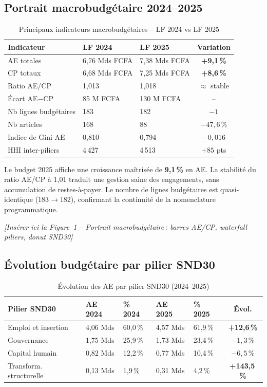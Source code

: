 \documentclass[12pt, a4paper]{article}
\newcommand{\pct}[1]{\textbf{#1\,\%}}
\newcommand{\sig}[1]{\textcolor{rougeCMR}{\textbf{#1}}}
\newcommand{\figref}[1]{\textcolor{bleuCMR}{\textit{[#1]}}}
\begin{document}
\subsection{Portrait macrobudgétaire 2024--2025}

\begin{table}[H]
\centering
\caption{Principaux indicateurs macrobudgétaires -- LF 2024 vs LF 2025}
\label{tab:macro}
\small
\begin{tabularx}{\linewidth}{lXXc}
\toprule
\rowcolor{bleuCMR!15}
\textbf{Indicateur} & \textbf{LF 2024} & \textbf{LF 2025} & \textbf{Variation} \\
\midrule
AE totales & 6,76 Mds FCFA & 7,38 Mds FCFA & \sig{+9,1\,\%} \\
CP totaux  & 6,68 Mds FCFA & 7,25 Mds FCFA & \sig{+8,6\,\%} \\
Ratio AE/CP & 1,013 & 1,018 & $\approx$ stable \\
Écart AE$-$CP & 85 M FCFA & 130 M FCFA & -- \\
Nb lignes budgétaires & 183 & 182 & $-1$ \\
Nb articles & 168 & 88 & $-47{,}6\,\%$ \\
Indice de Gini AE & 0,810 & 0,794 & $-0{,}016$ \\
HHI inter-piliers & 4\,427 & 4\,513 & $+85$ pts \\
\bottomrule
\end{tabularx}
\end{table}

Le budget 2025 affiche une croissance maîtrisée de \pct{9,1} en AE. La stabilité du ratio AE/CP 
à 1,01 traduit une gestion saine des engagements, sans accumulation de restes-à-payer. 
Le nombre de lignes budgétaires est quasi-identique (183$\to$182), confirmant la continuité 
de la nomenclature programmatique.

\figref{Insérer ici la Figure~1 -- Portrait macrobudgétaire\,: barres AE/CP, waterfall piliers, donut SND30}

\subsection{Évolution budgétaire par pilier SND30}

\begin{table}[H]
\centering
\caption{Évolution des AE par pilier SND30 (2024--2025)}
\label{tab:piliers}
\small
\begin{tabularx}{\linewidth}{lXXXXc}
\toprule
\rowcolor{bleuCMR!15}
\textbf{Pilier SND30} & \textbf{AE 2024} & \textbf{\% 2024} & \textbf{AE 2025} & \textbf{\% 2025} & \textbf{Évol.} \\
\midrule
Emploi et insertion & 4,06 Mds & 60,0\,\% & 4,57 Mds & 61,9\,\% & \sig{+12,6\,\%} \\
Gouvernance & 1,75 Mds & 25,9\,\% & 1,73 Mds & 23,4\,\% & $-1{,}3\,\%$ \\
Capital humain & 0,82 Mds & 12,2\,\% & 0,77 Mds & 10,4\,\% & \sig{$-6{,}5\,\%$} \\
Transform. structurelle & 0,13 Mds & 1,9\,\% & 0,31 Mds & 4,2\,\% & \sig{+143,5\,\%} \\
\bottomrule
\end{tabularx}
\end{table}
\end{document}
